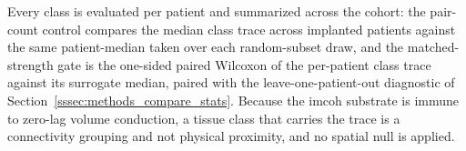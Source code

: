 Every class is evaluated per patient and summarized across the cohort: the pair-count control compares the median class trace across implanted patients against the same patient-median taken over each random-subset draw, and the matched-strength gate is the one-sided paired Wilcoxon of the per-patient class trace against its surrogate median, paired with the leave-one-patient-out diagnostic of Section~\ref{sssec:methods_compare_stats}. Because the \gls{imcoh} substrate is immune to zero-lag volume conduction, a tissue class that carries the trace is a connectivity grouping and not physical proximity, and no spatial null is applied.
